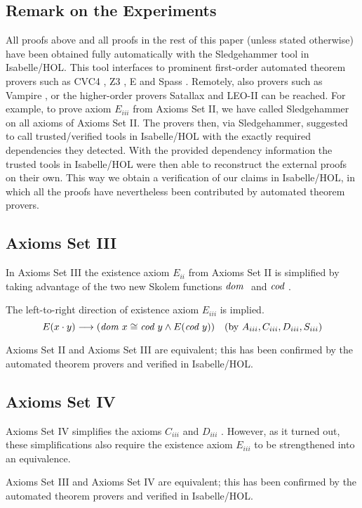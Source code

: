 \subsection{Remark on the Experiments}
All proofs above and all proofs in the rest of this paper (unless
stated otherwise) have been obtained fully automatically with the
Sledgehammer tool in Isabelle/HOL. This tool interfaces to prominent
first-order automated theorem provers such as CVC4 \cite{CVC4}, Z3
\cite{Z3}, E \cite{E} and Spass \cite{Spass}.  Remotely, also
  provers such as Vampire \cite{Vampire}, or the higher-order provers
  Satallax \cite{Satallax} and LEO-II \cite{LEO} can be reached. For
  example, to prove axiom $E_{iii}$ from Axioms Set II, we have called
  Sledgehammer on all axioms of Axioms Set II. The provers then, via
  Sledgehammer, suggested to call trusted/verified tools in
  Isabelle/HOL with the exactly required dependencies they
  detected. With the provided dependency information the trusted tools
  in Isabelle/HOL were then able to reconstruct the external proofs on
  their own.  This way we obtain a verification of our claims in
  Isabelle/HOL, in which all the proofs have nevertheless been
  contributed by automated theorem provers.


\subsection{Axioms Set III}
In Axioms Set III the existence  axiom  $E_{ii}$ from Axioms Set II  is simplified by taking advantage of 
  the two new Skolem functions ${\textit{dom \/}}$ and $\textit{cod \/}$.

The left-to-right direction of existence axiom $E_{iii}$ is implied.
  $$E(x \cdot y) \longrightarrow (\textit{dom \/} x \cong \textit{cod \/} y \wedge E(\textit{cod \/} y)) \quad  
    (\text{by } A_{iii}, C_{iii}, D_{iii}, S_{iii})$$

 Axioms Set II and Axioms Set III are equivalent; this has been
 confirmed by the automated theorem provers and verified in Isabelle/HOL.

\subsection{Axioms Set IV}
Axioms Set IV simplifies the axioms $C_{iii}$ and  $D_{iii}$ . However, as it turned 
 out, these simplifications also require the existence axiom $E_{iii}$ to be strengthened into
 an equivalence.

 Axioms Set III and Axioms Set IV are equivalent; this has been
 confirmed by the automated theorem provers and verified in
 Isabelle/HOL.

